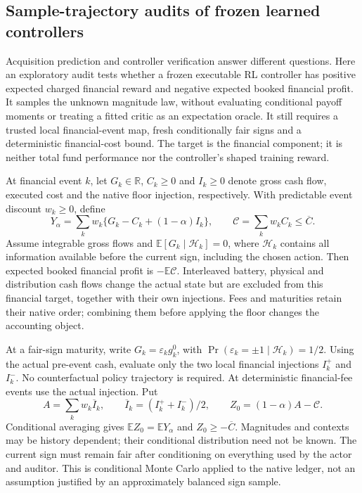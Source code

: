 \subsection{Sample-trajectory audits of frozen learned controllers}
\label{sec:adaptiveaudit}
Acquisition prediction and controller verification answer different questions. Here an exploratory audit tests whether a frozen executable RL controller has positive expected charged financial reward and negative expected booked financial profit. It samples the unknown magnitude law, without evaluating conditional payoff moments or treating a fitted critic as an expectation oracle. It still requires a trusted local financial-event map, fresh conditionally fair signs and a deterministic financial-cost bound. The target is the financial component; it is neither total fund performance nor the controller's shaped training reward.

At financial event $k$, let $G_k\in\mathbb R$, $C_k\ge0$ and $I_k\ge0$ denote gross cash flow, executed cost and the native floor injection, respectively. With predictable event discount $w_k\ge0$, define
\[
Y_\alpha=\sum_k w_k\{G_k-C_k+(1-\alpha)I_k\},\qquad
\mathcal C=\sum_k w_k C_k\le\overline C.
\]
Assume integrable gross flows and $\mathbb E[G_k\mid\mathcal H_k]=0$, where $\mathcal H_k$ contains all information available before the current sign, including the chosen action. Then expected booked financial profit is $-\mathbb E\mathcal C$. Interleaved battery, physical and distribution cash flows change the actual state but are excluded from this financial target, together with their own injections. Fees and maturities retain their native order; combining them before applying the floor changes the accounting object.

At a fair-sign maturity, write $G_k=\varepsilon_k g_k^0$, with $\Pr(\varepsilon_k=\pm1\mid\mathcal H_k)=1/2$. Using the actual pre-event cash, evaluate only the two local financial injections $I_k^+$ and $I_k^-$. No counterfactual policy trajectory is required. At deterministic financial-fee events use the actual injection. Put
\[
A=\sum_k w_k\overline I_k,\qquad
\overline I_k=(I_k^++I_k^-)/2,
\qquad Z_0=(1-\alpha)A-\mathcal C.
\]
Conditional averaging gives $\mathbb EZ_0=\mathbb EY_\alpha$ and $Z_0\ge-\overline C$. Magnitudes and contexts may be history dependent; their conditional distribution need not be known. The current sign must remain fair after conditioning on everything used by the actor and auditor. This is conditional Monte Carlo applied to the native ledger, not an assumption justified by an approximately balanced sign sample.

